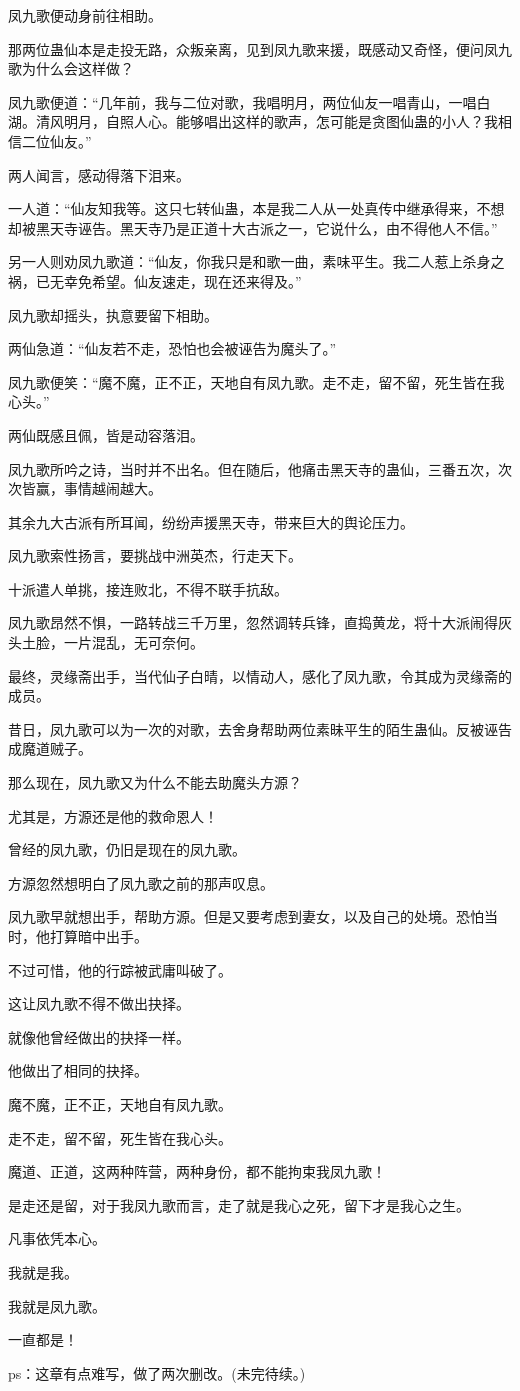 \begin{this_body}
凤九歌便动身前往相助。

那两位蛊仙本是走投无路，众叛亲离，见到凤九歌来援，既感动又奇怪，便问凤九歌为什么会这样做？

凤九歌便道：“几年前，我与二位对歌，我唱明月，两位仙友一唱青山，一唱白湖。清风明月，自照人心。能够唱出这样的歌声，怎可能是贪图仙蛊的小人？我相信二位仙友。”

两人闻言，感动得落下泪来。

一人道：“仙友知我等。这只七转仙蛊，本是我二人从一处真传中继承得来，不想却被黑天寺诬告。黑天寺乃是正道十大古派之一，它说什么，由不得他人不信。”

另一人则劝凤九歌道：“仙友，你我只是和歌一曲，素味平生。我二人惹上杀身之祸，已无幸免希望。仙友速走，现在还来得及。”

凤九歌却摇头，执意要留下相助。

两仙急道：“仙友若不走，恐怕也会被诬告为魔头了。”

凤九歌便笑：“魔不魔，正不正，天地自有凤九歌。走不走，留不留，死生皆在我心头。”

两仙既感且佩，皆是动容落泪。

凤九歌所吟之诗，当时并不出名。但在随后，他痛击黑天寺的蛊仙，三番五次，次次皆赢，事情越闹越大。

其余九大古派有所耳闻，纷纷声援黑天寺，带来巨大的舆论压力。

凤九歌索性扬言，要挑战中洲英杰，行走天下。

十派遣人单挑，接连败北，不得不联手抗敌。

凤九歌昂然不惧，一路转战三千万里，忽然调转兵锋，直捣黄龙，将十大派闹得灰头土脸，一片混乱，无可奈何。

最终，灵缘斋出手，当代仙子白晴，以情动人，感化了凤九歌，令其成为灵缘斋的成员。

昔日，凤九歌可以为一次的对歌，去舍身帮助两位素昧平生的陌生蛊仙。反被诬告成魔道贼子。

那么现在，凤九歌又为什么不能去助魔头方源？

尤其是，方源还是他的救命恩人！

曾经的凤九歌，仍旧是现在的凤九歌。

方源忽然想明白了凤九歌之前的那声叹息。

凤九歌早就想出手，帮助方源。但是又要考虑到妻女，以及自己的处境。恐怕当时，他打算暗中出手。

不过可惜，他的行踪被武庸叫破了。

这让凤九歌不得不做出抉择。

就像他曾经做出的抉择一样。

他做出了相同的抉择。

魔不魔，正不正，天地自有凤九歌。

走不走，留不留，死生皆在我心头。

魔道、正道，这两种阵营，两种身份，都不能拘束我凤九歌！

是走还是留，对于我凤九歌而言，走了就是我心之死，留下才是我心之生。

凡事依凭本心。

我就是我。

我就是凤九歌。

一直都是！

ps：这章有点难写，做了两次删改。(未完待续。)

\end{this_body}

